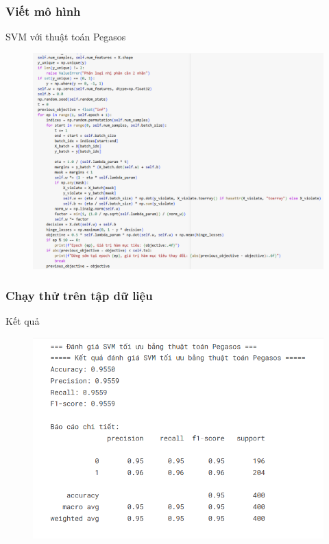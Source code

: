 \documentclass[serif, aspectratio=169]{beamer}
\begin{document}
	\subsubsection{Viết mô hình}
	\begin{frame}{SVM với thuật toán Pegasos}
		\begin{figure}
			\centering
			\includegraphics[width=0.6\linewidth]{pic/svm-pegasus.png}
			\label{fig:svm-pegasus}
		\end{figure}
	\end{frame}
	\subsubsection{Chạy thử trên tập dữ liệu}
	\begin{frame}{Kết quả}
		\begin{figure}
			\centering
			\includegraphics[width=0.7\linewidth]{pic/svm-pegasos-result2000.png}
			\label{fig:svm-pegasos-result2000}
		\end{figure}
	\end{frame}
\end{document}
